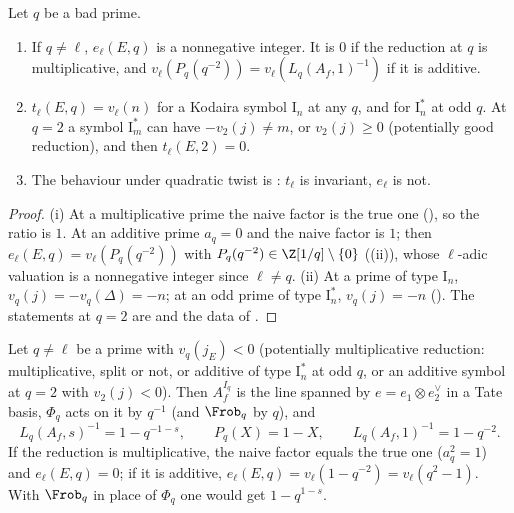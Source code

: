 \begin{proposition}\label{prop:lfunctions:terms}
Let $q$ be a bad prime.
\begin{enumerate}[label=(\roman*)]
\item If $q\ne\ell$, $e_\ell(E,q)$ is a nonnegative integer. It is $0$ if the reduction at $q$ is multiplicative, and $v_\ell(P_q(q^{-2}))=v_\ell(L_q(A_f,1)^{-1})$ if it is additive.
\item $t_\ell(E,q)=v_\ell(n)$ for a Kodaira symbol $\mathrm I_n$ at any $q$, and for $\mathrm I_n^*$ at odd $q$. At $q=2$ a symbol $\mathrm I_m^*$ can have $-v_2(j)\ne m$, or $v_2(j)\ge0$
(potentially good reduction), and then $t_\ell(E,2)=0$.
\item The behaviour under quadratic twist is : $t_\ell$ is invariant, $e_\ell$ is not.
\end{enumerate}
\end{proposition}

\begin{proof}
(i) At a multiplicative prime the naive factor is the true one (), so the ratio is $1$. At an additive prime $a_q=0$ and the naive factor is
$1$; then $e_\ell(E,q)=v_\ell(P_q(q^{-2}))$ with $P_q(q^{-2})\in\Z[1/q]\setminus\{0\}$ ((ii)), whose $\ell$-adic valuation is a nonnegative integer since
$\ell\ne q$. (ii) At a prime of type $\mathrm I_n$, $v_q(j)=-v_q(\Delta)=-n$; at an odd prime of type $\mathrm I_n^*$, $v_q(j)=-n$ (). The statements at $q=2$
are  and the data of .
\end{proof}

\begin{proposition}\label{prop:lfunctions:multiplicative}
Let $q\ne\ell$ be a prime with $v_q(j_E)<0$ (potentially multiplicative reduction: multiplicative, split or not, or additive of type $\mathrm I_n^*$ at odd $q$, or
an additive symbol at $q=2$ with $v_2(j)<0$). Then $A_f^{I_q}$ is the line spanned by $e=e_1\otimes e_2^\vee$ in a Tate basis, $\Phi_q$ acts on it by $q^{-1}$ (and $\Frob_q$ by $q$), and
\[
L_q(A_f,s)^{-1}=1-q^{-1-s},\qquad P_q(X)=1-X,\qquad L_q(A_f,1)^{-1}=1-q^{-2}.
\]
If the reduction is multiplicative, the naive factor equals the true one ($a_q^2=1$) and $e_\ell(E,q)=0$; if it is additive, $e_\ell(E,q)=v_\ell(1-q^{-2})=v_\ell(q^2-1)$. With $\Frob_q$
in place of $\Phi_q$ one would get $1-q^{1-s}$.
\end{proposition}


